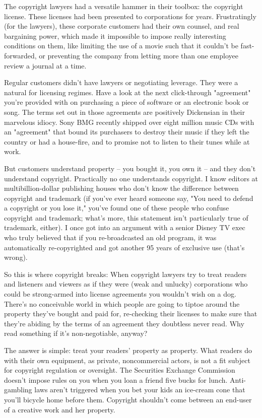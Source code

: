 The copyright lawyers had a versatile hammer in their toolbox: the
copyright license. These licenses had been presented to
corporations for years. Frustratingly (for the lawyers), these
corporate customers had their own counsel, and real bargaining
power, which made it impossible to impose really interesting
conditions on them, like limiting the use of a movie such that it
couldn't be fast-forwarded, or preventing the company from letting
more than one employee review a journal at a time.

Regular customers didn't have lawyers or negotiating leverage. They
were a natural for licensing regimes. Have a look at the next
click-through "agreement" you're provided with on purchasing a
piece of software or an electronic book or song. The terms set out
in those agreements are positively Dickensian in their marvelous
idiocy. Sony BMG recently shipped over eight million music CDs with
an "agreement" that bound its purchasers to destroy their music if
they left the country or had a house-fire, and to promise not to
listen to their tunes while at work.

But customers understand property -- you bought it, you own it --
and they don't understand copyright. Practically no one understands
copyright. I know editors at multibillion-dollar publishing houses
who don't know the difference between copyright and trademark (if
you've ever heard someone say, "You need to defend a copyright or
you lose it," you've found one of these people who confuse
copyright and trademark; what's more, this statement isn't
particularly true of trademark, either). I once got into an
argument with a senior Disney TV exec who truly believed that if
you re-broadcasted an old program, it was automatically
re-copyrighted and got another 95 years of exclusive use (that's
wrong).

So this is where copyright breaks: When copyright lawyers try to
treat readers and listeners and viewers as if they were (weak and
unlucky) corporations who could be strong-armed into license
agreements you wouldn't wish on a dog. There's no conceivable world
in which people are going to tiptoe around the property they've
bought and paid for, re-checking their licenses to make sure that
they're abiding by the terms of an agreement they doubtless never
read. Why read something if it's non-negotiable, anyway?

The answer is simple: treat your readers' property as property.
What readers do with their own equipment, as private, noncommercial
actors, is not a fit subject for copyright regulation or oversight.
The Securities Exchange Commission doesn't impose rules on you when
you loan a friend five bucks for lunch. Anti-gambling laws aren't
triggered when you bet your kids an ice-cream cone that you'll
bicycle home before them. Copyright shouldn't come between an
end-user of a creative work and her property.

